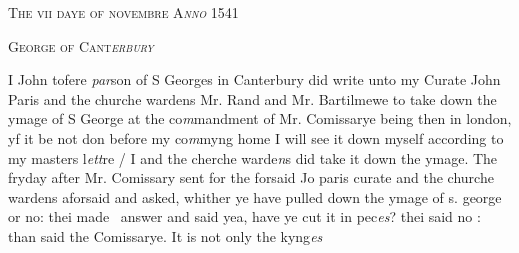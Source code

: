 \documentclass[12pt, a4paper]{book}
\begin{document}
 
 
 
 

            
            
               
				\begin{center} \begin{large} {\scshape The vii daye of novembre A\textit{nno} 1541
               } \end{large} \end{center}
			
               
               	
				\begin{center}  {\scshape George of Cant\textit{erbury}
                  }  \end{center}
			
               	
               		
			
               	
               		
				\marginpar[\vspace{0.5cm}{\textcolor{Gray}{Images}}]{}
			
               		
		\ifthenelse{\isodd{\thepage}}
		{\reversemarginpar}
		{\normalmarginpar}
		I John tofere \textit{par}son of S Georges in Canterbury did
  write unto my Curate John Paris and the churche
  	wardens Mr. Rand and Mr. Bartilmewe to take down
  the ymage of S George at the co\textit{m}mandment of Mr.
  	Comissarye being then in london, yf it be not don
 before my co\textit{m}myng home I will see it down myself
 according to my masters l\textit{ett}re / I and the cherche warde\textit{n}s
               			did take it down the ymage. The fryday after Mr.
 Comissary sent for the forsaid Jo paris curate and
 the churche wardens aforsaid and asked, whither ye
 have pulled down the ymage of s. george or no: thei made 
 answer and said yea, have ye cut it in pec\textit{es}? thei said
               			no : than said the Comissarye. It is not only the kyng\textit{es}
                  


\dotfill
					  \subsection*{}  \subsection*{}
\end{document}
